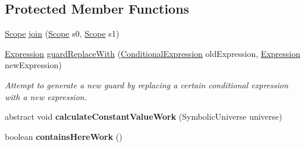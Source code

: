 \subsection*{Protected Member Functions}
\begin{DoxyCompactItemize}
\item 
\hyperlink{interfaceedu_1_1udel_1_1cis_1_1vsl_1_1civl_1_1model_1_1IF_1_1Scope}{Scope} \hyperlink{classedu_1_1udel_1_1cis_1_1vsl_1_1civl_1_1model_1_1common_1_1statement_1_1CommonStatement_a3bc30a56577e67bb4e8ba37518fb5c3a}{join} (\hyperlink{interfaceedu_1_1udel_1_1cis_1_1vsl_1_1civl_1_1model_1_1IF_1_1Scope}{Scope} s0, \hyperlink{interfaceedu_1_1udel_1_1cis_1_1vsl_1_1civl_1_1model_1_1IF_1_1Scope}{Scope} s1)
\item 
\hyperlink{interfaceedu_1_1udel_1_1cis_1_1vsl_1_1civl_1_1model_1_1IF_1_1expression_1_1Expression}{Expression} \hyperlink{classedu_1_1udel_1_1cis_1_1vsl_1_1civl_1_1model_1_1common_1_1statement_1_1CommonStatement_af15aea1cedcd333037094b3cc02f43f2}{guard\+Replace\+With} (\hyperlink{interfaceedu_1_1udel_1_1cis_1_1vsl_1_1civl_1_1model_1_1IF_1_1expression_1_1ConditionalExpression}{Conditional\+Expression} old\+Expression, \hyperlink{interfaceedu_1_1udel_1_1cis_1_1vsl_1_1civl_1_1model_1_1IF_1_1expression_1_1Expression}{Expression} new\+Expression)
\begin{DoxyCompactList}\small\item\em Attempt to generate a new guard by replacing a certain conditional expression with a new expression. \end{DoxyCompactList}\item 
\hypertarget{classedu_1_1udel_1_1cis_1_1vsl_1_1civl_1_1model_1_1common_1_1statement_1_1CommonStatement_ab7024906be17e916d90963cc24030e9d}{}abstract void {\bfseries calculate\+Constant\+Value\+Work} (Symbolic\+Universe universe)\label{classedu_1_1udel_1_1cis_1_1vsl_1_1civl_1_1model_1_1common_1_1statement_1_1CommonStatement_ab7024906be17e916d90963cc24030e9d}

\item 
\hypertarget{classedu_1_1udel_1_1cis_1_1vsl_1_1civl_1_1model_1_1common_1_1statement_1_1CommonStatement_a29e37aea60e49087202f3bece59882af}{}boolean {\bfseries contains\+Here\+Work} ()\label{classedu_1_1udel_1_1cis_1_1vsl_1_1civl_1_1model_1_1common_1_1statement_1_1CommonStatement_a29e37aea60e49087202f3bece59882af}

\end{DoxyCompactItemize}
